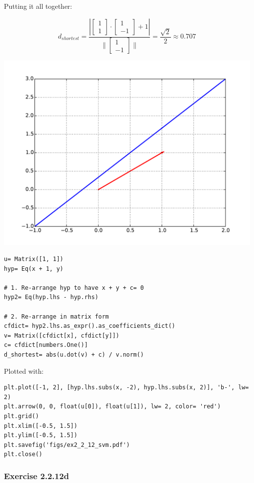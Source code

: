 Putting it all together:

\begin{equation}
d_{shortest} = \frac{
    |\left[\begin{matrix}1\\1\end{matrix}\right] \cdot \left[\begin{matrix}1\\-1\end{matrix}\right] + 1|
}{
    \|\left[\begin{matrix}1\\-1\end{matrix}\right]\|
} = \frac{\sqrt{2}}{2} \approx 0.707
\end{equation}

\includegraphics[width=0.75\linewidth]{figs/ex2_2_12_svm.pdf}

\begin{verbatim}
u= Matrix([1, 1])
hyp= Eq(x + 1, y)

# 1. Re-arrange hyp to have x + y + c= 0
hyp2= Eq(hyp.lhs - hyp.rhs)

# 2. Re-arrange in matrix form
cfdict= hyp2.lhs.as_expr().as_coefficients_dict()
v= Matrix([cfdict[x], cfdict[y]])
c= cfdict[numbers.One()]
d_shortest= abs(u.dot(v) + c) / v.norm()
\end{verbatim}

Plotted with:

\begin{verbatim}
plt.plot([-1, 2], [hyp.lhs.subs(x, -2), hyp.lhs.subs(x, 2)], 'b-', lw= 2)
plt.arrow(0, 0, float(u[0]), float(u[1]), lw= 2, color= 'red')
plt.grid()
plt.xlim([-0.5, 1.5])
plt.ylim([-0.5, 1.5])
plt.savefig('figs/ex2_2_12_svm.pdf')
plt.close()
\end{verbatim}

\subsubsection{Exercise 2.2.12d}

